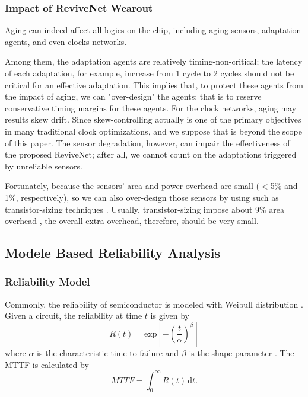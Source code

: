 \subsubsection{Impact of ReviveNet Wearout}\label{section_impactwearout}
Aging can indeed affect all logics on the chip, including aging sensors, adaptation agents, and even clocks networks.
	
Among them, the adaptation agents are relatively timing-non-critical; the latency of each adaptation, for example, increase from 1 cycle to 2 cycles should not be critical for an effective adaptation. This implies that, to protect these agents from the impact of aging, we can "over-design" the agents; that is to reserve conservative timing margins for these agents. For the clock networks, aging may results skew drift. Since skew-controlling actually is one of the primary objectives in many traditional clock optimizations, and we suppose that is beyond the scope of this paper. The sensor degradation, however, can impair the effectiveness of the proposed ReviveNet; after all, we cannot count on the adaptations triggered by unreliable sensors.
	
Fortunately, because the sensors' area and power overhead are small ($<$5\% and 1\%, respectively), so we can also over-design those sensors by using such as transistor-sizing techniques \cite{Temporal-Performance-Degradation-date06}. Usually, transistor-sizing impose about 9\% area overhead \cite{Temporal-Performance-Degradation-date06}, the overall extra overhead, therefore, should be very small.


\subsection {Modele Based Reliability Analysis}\label{section_model}

\subsubsection{Reliability Model}
Commonly, the reliability of semiconductor is modeled with Weibull distribution \cite{Handbook}. Given a circuit, the reliability at  time $t$ is given by
\begin{equation}\label{weibull}
  R(t)=\mbox{exp}[-(\frac{t}{\alpha})^\beta]
\end{equation}
where $\alpha$ is the characteristic time-to-failure and $\beta$ is the shape parameter \cite{Handbook}. The MTTF is calculated by
\begin{equation}
MTTF=\int^\infty_0 R(t)\,\mbox{d}t.
\end{equation}

